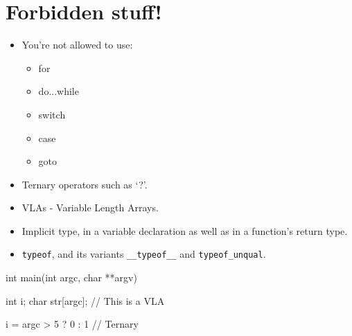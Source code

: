 \documentclass{42-en}
\begin{document}
    \section{Forbidden stuff!}

        \begin{itemize}

            \item You're not allowed to use:

                \begin{itemize}

                    \item for
                    \item do...while
                    \item switch
                    \item case
                    \item goto

                \end{itemize}

            \item Ternary operators such as `?'.

            \item VLAs - Variable Length Arrays.

            \item Implicit type, in a variable declaration as well as in a
              function's return type.

            \item \texttt{typeof}, and its variants \texttt{\_\_typeof\_\_} and
              \texttt{typeof\_unqual}.

        \end{itemize}

\vspace{1cm}
        
        \begin{42ccode}
    int main(int argc, char **argv)
    {
        int     i;
        char    str[argc]; // This is a VLA

        i = argc > 5 ? 0 : 1 // Ternary
    }
        \end{42ccode}
        \newpage

\end{document}
